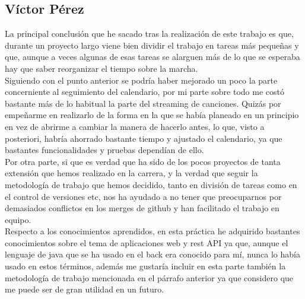 \documentclass{article}
\begin{document}
\subsection*{Víctor Pérez}
La principal conclusión que he sacado tras la realización de este trabajo es que, durante un proyecto largo viene bien dividir el trabajo en tareas más pequeñas y que, aunque a veces algunas de esas tareas se alarguen más de lo que se esperaba hay que saber reorganizar el tiempo sobre la marcha. \\
\hfill \break
Siguiendo con el punto anterior se podría haber mejorado un poco la parte concerniente al seguimiento del calendario, por mi parte sobre todo me costó bastante más de lo habitual la parte del streaming de canciones. Quizás por empeñarme en realizarlo de la forma en la que se había planeado en un principio en vez de abrirme a cambiar la manera de hacerlo antes, lo que, visto a posteriori, habría ahorrado bastante tiempo y ajustado el calendario, ya que bastantes funcionalidades y pruebas dependían de ello.\\
\hfill \break
Por otra parte, si que es verdad que ha sido de los pocos proyectos de tanta extensión que hemos realizado en la carrera, y la verdad que seguir la metodología de trabajo que hemos decidido, tanto en división de tareas como en el control de versiones etc, nos ha ayudado a no tener que preocuparnos por demasiados conflictos en los merges de github y han facilitado el trabajo en equipo.\\
\hfill \break
Respecto a los conocimientos aprendidos, en esta práctica he adquirido bastantes conocimientos sobre el tema de aplicaciones web y rest API ya que, aunque el lenguaje de java que se ha usado en el back era conocido para mí, nunca lo había usado en estos términos, además me gustaría incluir en esta parte también la metodología de trabajo mencionada en el párrafo anterior ya que considero que me puede ser de gran utilidad en un futuro.
\end{document}
